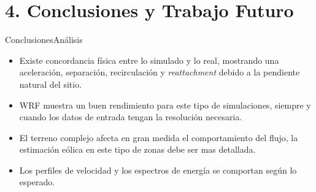 \documentclass[mathserif]{beamer}
\begin{document}

\section{4. Conclusiones y Trabajo Futuro}
\begin{frame}{Conclusiones}{Análisis}
\begin{itemize}\justifying
  \item Existe concordancia física entre lo simulado y lo real, mostrando una aceleración, separación, recirculación y  \emph{reattachment} debido a la pendiente natural del sitio.
  \item WRF muestra un buen rendimiento para este tipo de simulaciones, siempre y cuando los datos de entrada tengan la resolución necesaria.
  \item El terreno complejo afecta en gran medida el comportamiento del flujo, la estimación eólica en este tipo de zonas debe ser mas detallada.
  \item Los perfiles de velocidad y los espectros de energía se comportan según lo esperado.
\end{itemize}
\end{frame}
\end{document}
